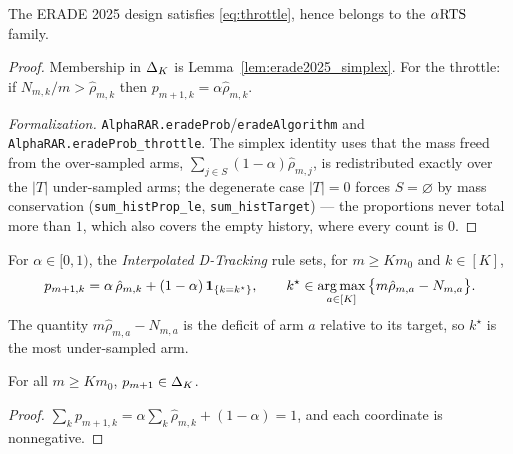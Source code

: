 \begin{lemma}\label{lem:erade2025_isARTS}
\leanok
{}
The ERADE 2025 design satisfies \eqref{eq:throttle}, hence belongs to the
$\alpha\text{RTS}$ family.
\end{lemma}

\begin{proof}\leanok
{}
Membership in $\Delta_K$ is Lemma~\ref{lem:erade2025_simplex}. For the throttle:
if $N_{m,k}/m > \hat{\rho}_{m,k}$ then $p_{m+1,k} = \alpha\hat{\rho}_{m,k}$.

\emph{Formalization.} \texttt{AlphaRAR.eradeProb}/\texttt{eradeAlgorithm} and
\texttt{AlphaRAR.eradeProb\_throttle}. The simplex identity uses that the mass freed from the
over-sampled arms, $\sum_{j\in S}(1-\alpha)\hat\rho_{m,j}$, is redistributed exactly over the $|T|$
under-sampled arms; the degenerate case $|T|=0$ forces $S=\varnothing$ by mass conservation
(\texttt{sum\_histProp\_le}, \texttt{sum\_histTarget}) --- the proportions never total more than
$1$, which also covers the empty history, where every count is $0$.
\end{proof}

\begin{definition}\label{def:d_tracking}
\leanok
{}
For $\alpha \in [0,1)$, the \emph{Interpolated D-Tracking} rule sets, for
$m \ge K m_0$ and $k \in [K]$,
\[
  p_{m+1,k} = \alpha\, \hat{\rho}_{m,k} + (1-\alpha)\,\mathbf{1}_{\{k = k^\star\}},
  \qquad
  k^\star \in \operatorname*{arg\,max}_{a \in [K]} \big\{ m\hat{\rho}_{m,a} - N_{m,a} \big\}.
\]
The quantity $m\hat{\rho}_{m,a} - N_{m,a}$ is the deficit of arm $a$ relative to
its target, so $k^\star$ is the most under-sampled arm.
\end{definition}

\begin{lemma}\label{lem:d_tracking_simplex}
\leanok
{}
For all $m \ge K m_0$, $p_{m+1} \in \Delta_K$.
\end{lemma}

\begin{proof}\leanok
$\sum_k p_{m+1,k} = \alpha \sum_k \hat{\rho}_{m,k} + (1-\alpha) = 1$, and each
coordinate is nonnegative.
\end{proof}

